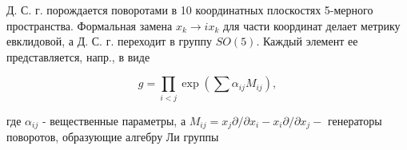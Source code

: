 \documentclass[10pt]{article}
\begin{document}
Д. С. г. порождается поворотами в 10 координатных плоскостях 5-мерного пространства. Формальная замена $x_{k} \rightarrow i x_{k}$ для части координат делает метрику евклидовой, а Д. С. г. переходит в группу $S O(5)$. Каждый элемент ее представляется, напр., в виде



\[

g=\prod_{i<j} \exp \left(\sum \alpha_{i j} M_{i j}\right),

\]



где $\alpha_{i j}$ - вещественные параметры, а $M_{i j}=x_{j} \partial / \partial x_{i}-x_{i} \partial / \partial x_{j}-$ генераторы поворотов, образующие алгебру Ли группы
\end{document}
